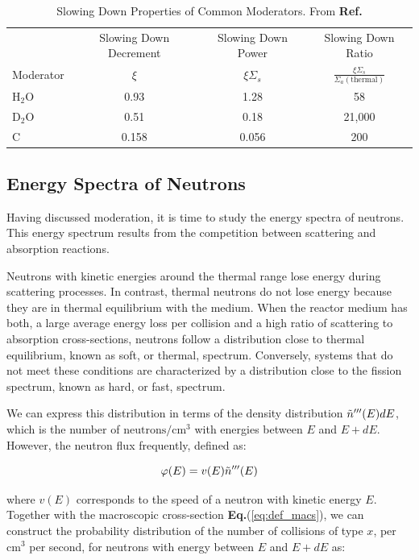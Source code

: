 \begin{table}[h]
    \caption{Slowing Down Properties of Common Moderators. From \textbf{Ref.} \cite{Lewis_2014}}
        \begin{tabular}{lccc}
            \toprule
            & Slowing Down Decrement  & Slowing Down Power  & Slowing Down Ratio \\
            \multirow{1}{*}{Moderator}
            & $\xi$ & $\xi\Sigma_s$ & $\frac{\xi\Sigma_s}{\Sigma_a (\text{thermal})}$ \\
            \midrule
            H$_2$O & 0.93 & 1.28 & 58 \\
            D$_2$O & 0.51 & 0.18 & 21,000 \\
            C      & 0.158 & 0.056 & 200 \\
            \bottomrule
        \end{tabular}
\end{table}

\subsection{Energy Spectra of Neutrons}

Having discussed moderation, it is time to study the energy spectra of neutrons. This energy spectrum results from the competition between scattering and absorption reactions.

Neutrons with kinetic energies around the thermal range lose energy during scattering processes. In contrast, thermal neutrons do not lose energy because they are in thermal equilibrium with the medium. When the reactor medium has both, a large average energy loss per collision and a high ratio of scattering to absorption cross-sections, neutrons follow a distribution close to thermal equilibrium, known as soft, or thermal, spectrum. Conversely, systems that do not meet these conditions are characterized by a distribution close to the fission spectrum, known as hard, or fast, spectrum.

We can express this distribution in terms of the density distribution $\Tilde{n}'''(E)dE$, which is the number of $\text{neutrons}/\text{cm}^{3}$ with energies between $E$ and $E + dE$. However, the neutron flux frequently, defined as:

\begin{equation}
    \varphi(E) = v(E)\Tilde{n}'''(E)
    \label{eq:neutron_flux}
\end{equation}

where \(v(E)\) corresponds to the speed of a neutron with kinetic energy \(E\). Together with the macroscopic cross-section \textbf{Eq.}(\ref{eq:def_macs}), we can construct the probability distribution of the number of collisions of type \(x\), per \(\text{cm}^{3}\) per second, for neutrons with energy between $E$ and $E + dE$ as:

